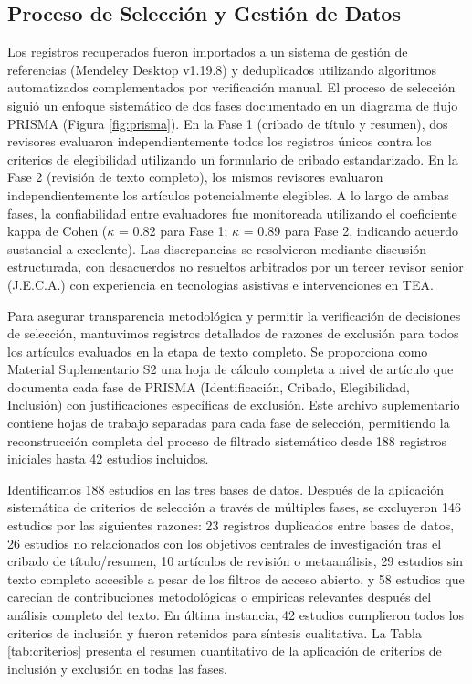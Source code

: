 \documentclass{ieeeaccess}
\begin{document}
	\subsection{Proceso de Selección y Gestión de Datos}
	Los registros recuperados fueron importados a un sistema de gestión de referencias (Mendeley Desktop v1.19.8) y deduplicados utilizando algoritmos automatizados complementados por verificación manual. El proceso de selección siguió un enfoque sistemático de dos fases documentado en un diagrama de flujo PRISMA (Figura \ref{fig:prisma}). En la Fase 1 (cribado de título y resumen), dos revisores evaluaron independientemente todos los registros únicos contra los criterios de elegibilidad utilizando un formulario de cribado estandarizado. En la Fase 2 (revisión de texto completo), los mismos revisores evaluaron independientemente los artículos potencialmente elegibles. A lo largo de ambas fases, la confiabilidad entre evaluadores fue monitoreada utilizando el coeficiente kappa de Cohen ($\kappa$ = 0.82 para Fase 1; $\kappa$ = 0.89 para Fase 2, indicando acuerdo sustancial a excelente). Las discrepancias se resolvieron mediante discusión estructurada, con desacuerdos no resueltos arbitrados por un tercer revisor senior (J.E.C.A.) con experiencia en tecnologías asistivas e intervenciones en TEA.
	
	Para asegurar transparencia metodológica y permitir la verificación de decisiones de selección, mantuvimos registros detallados de razones de exclusión para todos los artículos evaluados en la etapa de texto completo. Se proporciona como Material Suplementario S2 una hoja de cálculo completa a nivel de artículo que documenta cada fase de PRISMA (Identificación, Cribado, Elegibilidad, Inclusión) con justificaciones específicas de exclusión. Este archivo suplementario contiene hojas de trabajo separadas para cada fase de selección, permitiendo la reconstrucción completa del proceso de filtrado sistemático desde 188 registros iniciales hasta 42 estudios incluidos.
	
	Identificamos 188 estudios en las tres bases de datos. Después de la aplicación sistemática de criterios de selección a través de múltiples fases, se excluyeron 146 estudios por las siguientes razones: 23 registros duplicados entre bases de datos, 26 estudios no relacionados con los objetivos centrales de investigación tras el cribado de título/resumen, 10 artículos de revisión o metaanálisis, 29 estudios sin texto completo accesible a pesar de los filtros de acceso abierto, y 58 estudios que carecían de contribuciones metodológicas o empíricas relevantes después del análisis completo del texto. En última instancia, 42 estudios cumplieron todos los criterios de inclusión y fueron retenidos para síntesis cualitativa. La Tabla \ref{tab:criterios} presenta el resumen cuantitativo de la aplicación de criterios de inclusión y exclusión en todas las fases.
	
\end{document}
